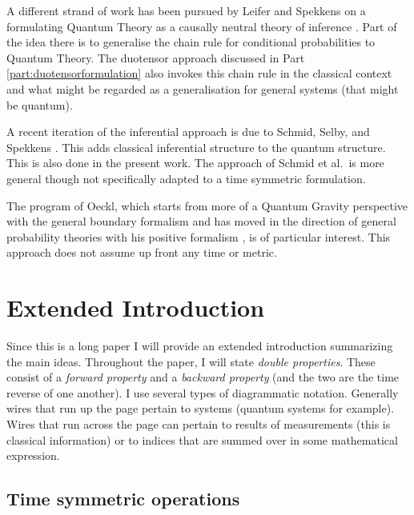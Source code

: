 \documentclass[10pt]{article}
\begin{document}
A different strand of work has been pursued by Leifer and Spekkens on a formulating Quantum Theory as a causally neutral theory of inference \cite{leifer2013towards}.  Part of the idea there is to generalise the chain rule for conditional probabilities to Quantum Theory.  The duotensor approach discussed in Part \ref{part:duotensorformulation} also invokes this chain rule in the classical context and what might be regarded as a generalisation for general systems (that might be quantum).

A recent iteration of the inferential approach is due to Schmid, Selby, and Spekkens \cite{schmid2020unscrambling}.  This adds classical inferential structure to the quantum structure.  This is also done in the present work.   The approach of Schmid et al.\ is more general though not specifically adapted to a time symmetric formulation.

The program of Oeckl,  which starts from more of a Quantum Gravity perspective with the general boundary formalism \cite{oeckl2003general} and has moved in the direction of general probability theories with his positive formalism \cite{oeckl2013positive, oeckl2016local}, is of particular interest.  This approach does not assume up front any time or metric.


\section{Extended Introduction}\label{sec:extendedintroduction}

Since this is a long paper I will provide an extended introduction summarizing the main ideas.  Throughout the paper, I will state \emph{double properties}. These consist of a \emph{forward property} and a \emph{backward property} (and the two are the time reverse of one another).  I use several types of diagrammatic notation.   Generally wires that run up the page pertain to systems (quantum systems for example).   Wires that run across the page can pertain to results of measurements (this is classical information) or to indices that are summed over in some mathematical expression.

\subsection{Time symmetric operations}
\end{document}
